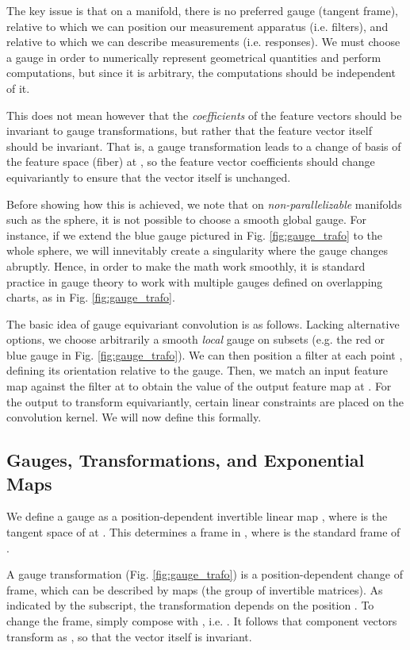 \documentclass{article}
\begin{document}
The key issue is that on a manifold, there is no preferred gauge (tangent frame), relative to which we can position our measurement apparatus (i.e. filters), and relative to which we can describe measurements (i.e. responses).
We must choose a gauge in order to 
numerically represent geometrical quantities and perform computations, but since it is arbitrary, the computations should be independent of it.

This does not mean however that the \emph{coefficients} of the feature vectors should be invariant to gauge transformations, but rather that the feature vector itself should be invariant.
That is, a gauge transformation leads to a change of basis  of the feature space (fiber) at , so the feature vector coefficients  should change equivariantly to ensure that the vector  itself is unchanged.

Before showing how this is achieved, we note that on \emph{non-parallelizable} manifolds such as the sphere, it is not possible to choose a smooth global gauge.
For instance, if we extend the blue gauge pictured in Fig. \ref{fig:gauge_trafo} to the whole sphere, we will innevitably create a singularity where the gauge changes abruptly.
Hence, in order to make the math work smoothly, it is standard practice in gauge theory to work with multiple gauges defined on overlapping charts, as in Fig. \ref{fig:gauge_trafo}.

The basic idea of gauge equivariant convolution is as follows.
Lacking alternative options, we choose arbitrarily a smooth \emph{local} gauge on subsets  (e.g. the red or blue gauge in Fig. \ref{fig:gauge_trafo}).
We can then position a filter at each point , defining its orientation relative to the gauge.
Then, we match an input feature map against the filter at  to obtain the value of the output feature map at .
For the output to transform equivariantly, certain linear constraints are placed on the convolution kernel.
We will now define this formally.


\subsection{Gauges, Transformations, and Exponential Maps}

We define a gauge as a position-dependent invertible linear map , where  is the tangent space of  at .
This determines a frame  in , where  is the standard frame of .

A gauge transformation (Fig. \ref{fig:gauge_trafo}) is a position-dependent change of frame, which can be described by maps  (the group of invertible  matrices).
As indicated by the subscript, the transformation  depends on the position .
To change the frame, simply compose  with , i.e. .
It follows that component vectors  transform as , so that the vector  itself is invariant.
\end{document}

